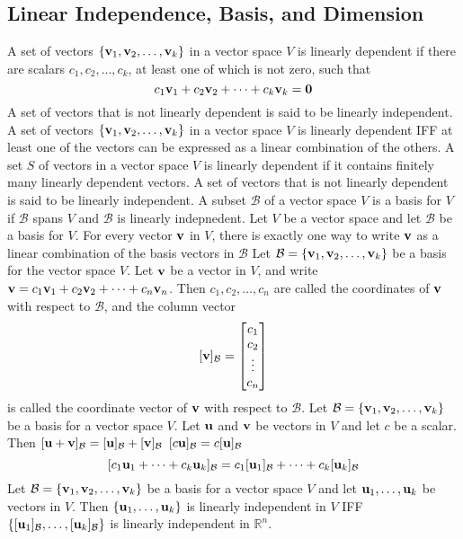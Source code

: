 \documentclass{article}
\begin{document}
    \subsection{Linear Independence, Basis, and Dimension}
    \begin{outline}
        \1 A set of vectors \(\{\vb v_1,\vb v_2,\ldots,\vb v_k\}\) in a vector space $V$ is linearly dependent if there are scalars \(c_1,c_2,\ldots,c_k\), at least one of which is not zero, such that \[c_1\vb v_1+c_2\vb v_2+\cdots+c_k\vb v_k=\vb 0\] A set of vectors that is not linearly dependent is said to be linearly independent. 
        \1 A set of vectors \(\{\vb v_1,\vb v_2,\ldots,\vb v_k\}\) in a vector space $V$ is linearly dependent IFF at least one of the vectors can be expressed as a linear combination of the others. 
        \1 A set $S$ of vectors in a vector space $V$ is linearly dependent if it contains finitely many linearly dependent vectors. A set of vectors that is not linearly dependent is said to be linearly independent. 
        \1 A subset \(\mathcal B\) of a vector space $V$ is a basis for $V$ if 
            \2 \(\mathcal B\) spans $V$ and 
            \2 \(\mathcal B\) is linearly indepnedent. 
        \1 Let $V$ be a vector space and let \(\mathcal B\) be a basis for $V$. For every vector \(\vb v\) in $V$, there is exactly one way to write $\vb v$ as a linear combination of the basis vectors in \(\mathcal B\)
        \1 Let \(\mathcal B=\{\vb v_1,\vb v_2,\ldots,\vb v_k\}\) be a basis for the vector space $V$. Let \(\vb v\) be a vector in $V$, and write \(\vb v=c_1\vb v_1+c_2\vb v_2+\cdots+c_n\vb v_n\). Then \(c_1,c_2,\ldots,c_n\) are called the coordinates of \(\vb v\) with respect to \(\mathcal B\), and the column vector \[[\vb v]_{\mathcal B}=\begin{bmatrix}
            c_1\\c_2\\\vdots\\c_n
        \end{bmatrix}\] is called the coordinate vector of \(\vb v\) with respect to \(\mathcal B\). 
        \1 Let \(\mathcal B=\{\vb v_1,\vb v_2,\ldots,\vb v_k\}\) be a basis for a vector space $V$. Let \(\vb u\) and \(\vb v\) be vectors in $V$ and let \(c\) be a scalar. Then 
            \2 \([\vb u+\vb v]_\mathcal B=[\vb u]_\mathcal B+[\vb v]_\mathcal B\)
            \2 \([c\vb u]_\mathcal B=c[\vb u]_\mathcal B\)
        \1 \[[c_1\vb u_1+\cdots+c_k\vb u_k]_\mathcal B=c_1[\vb u_1]_\mathcal B+\cdots+c_k[\vb u_k]_\mathcal B\]
        \1 Let \(\mathcal B=\{\vb v_1,\vb v_2,\ldots,\vb v_k\}\) be a basis for a vector space $V$ and let \(\vb u_1,\ldots,\vb u_k\) be vectors in $V$. Then \(\{\vb u_1,\ldots,\vb u_k\}\) is linearly independent in $V$ IFF \(\{[\vb u_1]_\mathcal B,\ldots,[\vb u_k]_\mathcal B\}\) is linearly independent in \(\mathbb R^n\). 

\end{outline}
\end{document}
